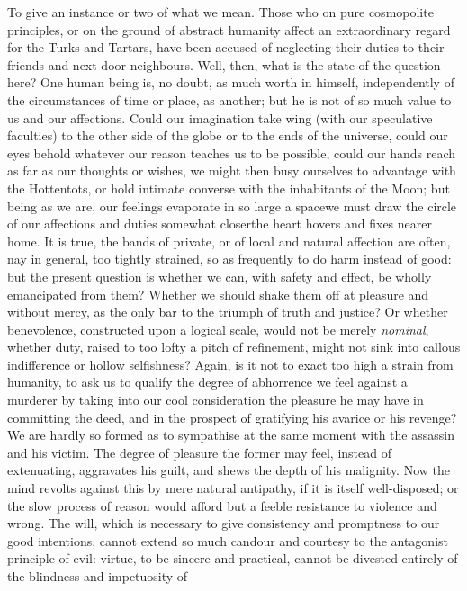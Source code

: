 To give an instance or two of what we mean. Those who on pure
cosmopolite principles, or on the ground of abstract humanity
affect an extraordinary regard for the Turks and Tartars, have
been accused of neglecting their duties to their friends and
next-door neighbours. Well, then, what is the state of the
question here? One human being is, no doubt, as much worth in
himself, independently of the circumstances of time or place, as
another; but he is not of so much value to us and our
affections. Could our imagination take wing (with our speculative
faculties) to the other side of the globe or to the ends of the
universe, could our eyes behold whatever our reason teaches us to
be possible, could our hands reach as far as our thoughts or
wishes, we might then busy ourselves to advantage with the
Hottentots, or hold intimate converse with the inhabitants of the
Moon; but being as we are, our feelings evaporate in so large a
space\textemdash we must draw the circle of our affections and
duties somewhat closer\textemdash the heart hovers and fixes
nearer home. It is true, the bands of private, or of local and
natural affection are often, nay in general, too tightly strained,
so as frequently to do harm instead of good: but the present
question is whether we can, with safety and effect, be wholly
emancipated from them?  Whether we should shake them off at
pleasure and without mercy, as the only bar to the triumph of
truth and justice? Or whether benevolence, constructed upon a
logical scale, would not be merely \emph{nominal}, whether duty,
raised to too lofty a pitch of refinement, might not sink into
callous indifference or hollow selfishness? Again, is it not to
exact too high a strain from humanity, to ask us to qualify the
degree of abhorrence we feel against a murderer by taking into our
cool consideration the pleasure he may have in committing the
deed, and in the prospect of gratifying his avarice or his
revenge? We are hardly so formed as to sympathise at the same
moment with the assassin and his victim. The degree of pleasure
the former may feel, instead of extenuating, aggravates his guilt,
and shews the depth of his malignity.  Now the mind revolts
against this by mere natural antipathy, if it is itself
well-disposed; or the slow process of reason would afford but a
feeble resistance to violence and wrong. The will, which is
necessary to give consistency and promptness to our good
intentions, cannot extend so much candour and courtesy to the
antagonist principle of evil: virtue, to be sincere and practical,
cannot be divested entirely of the blindness and impetuosity of
